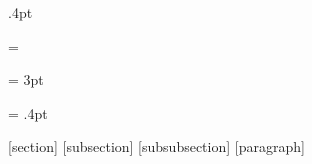 \def\quotation{\list{}{\listparindent 1.5em
    \itemindent\listparindent
    \rightmargin\leftmargin \parsep \z@ plus\p@}\item[]}
\let\endquotation=\endlist

\def\quote{\list{}{\rightmargin\leftmargin}\item[]}
\let\endquote=\endlist

\def\descriptionlabel#1{\hspace\labelsep \nasb #1}
\def\description{\list{}{\labelwidth\z@ \itemindent-\leftmargin
       \let\makelabel\descriptionlabel}}

\let\enddescription\endlist

\def\theequation{\arabic{equation}}

\def\titlepage{\@restonecolfalse\if@twocolumn\@restonecoltrue\onecolumn
     \else \newpage \fi \thispagestyle{empty}\c@page\z@}

\def\endtitlepage{\if@restonecol\twocolumn \else \newpage \fi}

\arraycolsep 5pt

\tabcolsep 6pt

\arrayrulewidth .4pt
\doublerulesep 2pt

\tabbingsep {}

\skip\@mpfootins = \skip\footins

\fboxsep = 3pt

\fboxrule = .4pt

[section]
[subsection]
[subsubsection]
[paragraph]

\def\thepart          {\Roman{part}}
\def\thesection       {\arabic{section}}
\def\thesubsection    {\thesection.\arabic{subsection}}
\def\thesubsubsection {\thesubsection .\arabic{subsubsection}}
\def\theparagraph     {\thesubsubsection.\arabic{paragraph}}
\def\thesubparagraph  {\theparagraph.\arabic{subparagraph}}

\def\part{\par
   \addvspace{4ex}
   \@afterindentfalse
   \secdef\@part\@spart}

\def\@part[#1]#2{\ifnum \c@secnumdepth >\m@ne
        \refstepcounter{part}
        \addcontentsline{toc}{part}{\thepart
        \hspace{1em}#1}\else
      \addcontentsline{toc}{part}{#1}\fi
   {\parindent \z@ \raggedleft    %
    \interlinepenalty \@M
    \ifnum \c@secnumdepth >\m@ne
    \Large \nasb \partname~\beginL\thepart\endL %
      \par\nobreak
    \fi
    \huge \nasb  %
    #2%
    \markboth{}{}\par
   }\nobreak
   \vskip 3ex
   \@afterheading
  }

